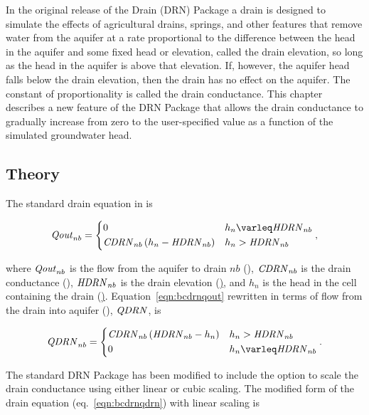 In the original release of the \mf Drain (DRN) Package a drain is designed to simulate the effects of agricultural drains, springs, and other features that remove water from the aquifer at a rate proportional to the difference between the head in the aquifer and some fixed head or elevation, called the drain elevation, so long as the head in the aquifer is above that elevation. If, however, the aquifer head falls below the drain elevation, then the drain has no effect on the aquifer. The constant of proportionality is called the drain conductance.  This chapter describes a new feature of the \mf DRN Package that allows the drain conductance to gradually increase from zero to the user-specified value as a function of the simulated groundwater head.

\subsection{Theory}

The standard drain equation in \mf is

\begin{align}
	\label{eqn:bcdrnqout}
    	\mli{Qout}_{nb} = \begin{dcases} 
    		0 &h_{n} \le \mli{HDRN}_{nb} \\
    		\mli{CDRN}_{nb} \left( h_{n} - \mli{HDRN}_{nb} \right) &h_{n} > \mli{HDRN}_{nb}
	\end{dcases} ,
\end{align}

\noindent where $\mathit{Qout}_{nb}$ is the flow from the aquifer to drain $nb$ (\ulct), $\mathit{CDRN}_{nb}$ is the drain conductance (\ulst), $\mathit{HDRN}_{nb}$ is the drain elevation (\ul), and $h_{n}$ is the head in the cell containing the drain (\ul). Equation~\ref{eqn:bcdrnqout} rewritten in terms of flow from the drain into aquifer (\ulct), $\mathit{QDRN}$, is

\begin{align}
	\label{eqn:bcdrnqdrn}
    	\mli{QDRN}_{nb} = \begin{dcases} 
    		\mli{CDRN}_{nb} \left( \mli{HDRN}_{nb} - h_{n} \right) &h_{n} > \mli{HDRN}_{nb} \\
    		0 &h_{n} \le \mli{HDRN}_{nb}
	\end{dcases} .
\end{align}

The standard DRN Package has been modified to include the option to scale the drain conductance using either linear or cubic scaling. The modified form of the drain equation (eq.~\ref{eqn:bcdrnqdrn}) with linear scaling is

